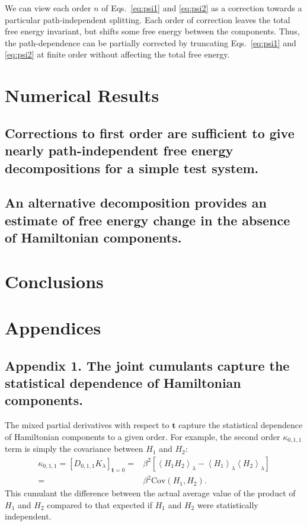 \documentclass{article}
\let\vec\mathbf
\begin{document}
We can view each order $n$ of Eqs.~\ref{eq:psi1} and \ref{eq:psi2} as a correction towards a particular path-independent splitting. Each order of correction leaves the total free energy invariant, but shifts some free energy between the components. Thus, the path-dependence can be partially corrected by truncating Eqs.~\ref{eq:psi1} and \ref{eq:psi2} at finite order without affecting the total free energy.










\section{Numerical Results}

\subsection{Corrections to first order are sufficient to give nearly path-independent free energy decompositions for a simple test system.}

\subsection{An alternative decomposition provides an estimate of free energy change in the absence of Hamiltonian components.}

\section{Conclusions}

\section*{Appendices}
\subsection*{Appendix 1. The joint cumulants capture the statistical dependence of Hamiltonian components.}

The mixed partial derivatives with respect to $\vec t$ capture the statistical dependence of Hamiltonian components to a given order. For example, the second order $\kappa_{0,1,1}$ term is simply the covariance between $H_1$ and $H_2$:
\begin{align}
\kappa_{0, 1, 1} = [D_{0, 1, 1} K_\lambda]_{\vec t=0} =&
	\beta^2 \left[
    	\left\langle H_1 H_2 \right\rangle_\lambda -
		\left\langle H_1 \right\rangle_\lambda 
		\left\langle H_2 \right\rangle_\lambda
    \right] \nonumber\\
    =&
    \beta^2 \mathrm{Cov}(H_1,H_2).              
\end{align}
This cumulant the difference between the actual average value of the product of $H_1$ and $H_2$ compared to that expected if $H_1$ and $H_2$ were statistically independent.
\end{document}
